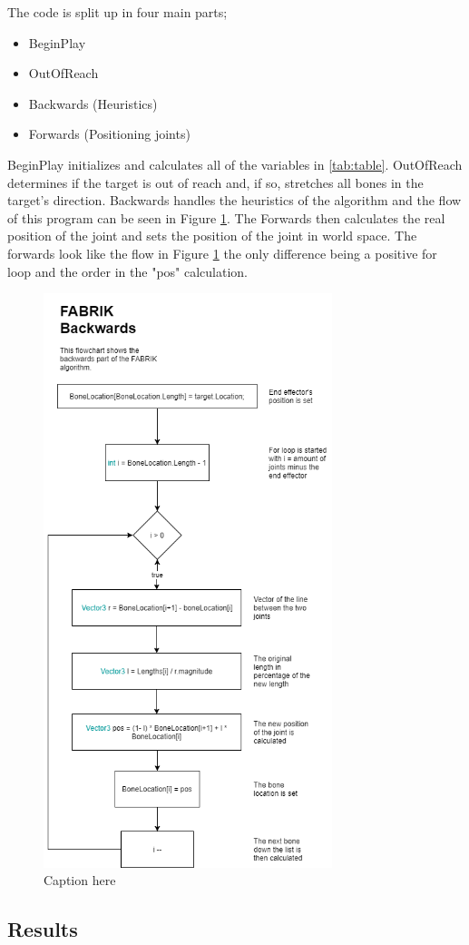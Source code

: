 The code is split up in four main parts;

\begin{itemize}
\item BeginPlay
\item OutOfReach
\item Backwards (Heuristics)
\item Forwards (Positioning joints)
\end{itemize}

BeginPlay initializes and calculates all of the variables in \autoref{tab:table}. OutOfReach determines if the target is out of reach and, if so, stretches all bones in the target's direction. 
Backwards handles the heuristics of the algorithm and the flow of this program can be seen in Figure \ref{fig:flow}. The Forwards then calculates the real position of the joint and sets the position of the joint in world space. The forwards look like the flow in Figure \ref{fig:flow} the only difference being a positive for loop and the order in the "pos" calculation.

\begin{figure}[hbtp]
\centering
\includegraphics[width=0.75\textwidth]{fabrik/Flowchart}
\caption{Caption here}
\label{fig:flow}
\end{figure}

\subsection*{Results}